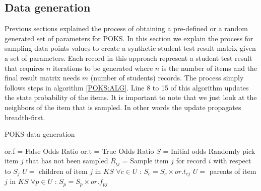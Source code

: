 \subsection{Data generation}


Previous sections explained the process of obtaining a pre-defined or a random generated set of parameters for POKS. In this section we explain the process for sampling data points values to create a synthetic student test result matrix given a set of parameters. Each record in this approach represent a student test result that requires $n$ iterations to be generated where $n$ is the number of items and the final result matrix needs $m$ (number of students) records. The process simply follows steps in algorithm \ref{POKS:ALG}. Line 8 to 15 of this algorithm updates the state probability of the items. It is important to note that we just look at the neighbors of the item that is sampled. In other words the update propagates breadth-first.


\begin{algorithm}
\caption{POKS data generation}
\label{CHalgorithm}
\begin{algorithmic}[1]
\State or.f = False Odds Ratio
\State or.t = True Odds Ratio
\State  $S$ = Initial odds
\State Randomly pick item $j$ that has not been sampled
\State $R_{ij}$ =  Sample item $j$ for record $i$ with respect to $S_j$
\State $U =$ children of item $j$ in $KS$
\State  $\forall c\in U$ :  $S_c = S_c\times or.t_{cj}$
\EndIf
{}
\State $U =$ parents of item $j$ in $KS$
\State  $\forall p\in U$ :  $S_p = S_p\times or.f_{pj}$
\EndIf
\EndFor
\EndFor
\end{algorithmic}
\label{POKS:ALG}
\end{algorithm}

